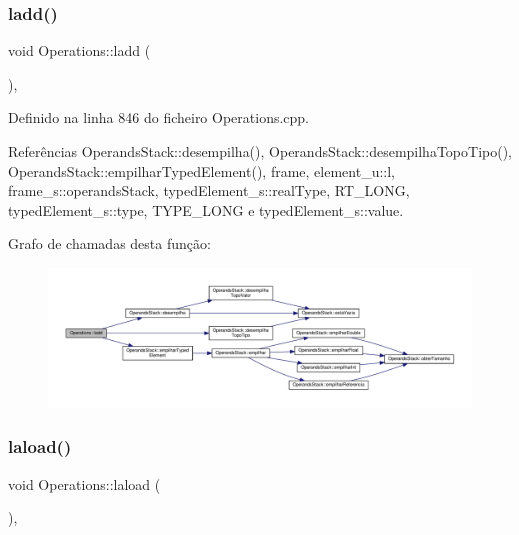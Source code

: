 \subsubsection{\texorpdfstring{ladd()}{ladd()}}
{\footnotesize\ttfamily void Operations\+::ladd (\begin{DoxyParamCaption}{ }\end{DoxyParamCaption})\hspace{0.3cm}{\ttfamily [static]}, {\ttfamily [private]}}



Definido na linha 846 do ficheiro Operations.\+cpp.



Referências Operands\+Stack\+::desempilha(), Operands\+Stack\+::desempilha\+Topo\+Tipo(), Operands\+Stack\+::empilhar\+Typed\+Element(), frame, element\+\_\+u\+::l, frame\+\_\+s\+::operands\+Stack, typed\+Element\+\_\+s\+::real\+Type, R\+T\+\_\+\+L\+O\+NG, typed\+Element\+\_\+s\+::type, T\+Y\+P\+E\+\_\+\+L\+O\+NG e typed\+Element\+\_\+s\+::value.

Grafo de chamadas desta função\+:\nopagebreak
\begin{figure}[H]
\begin{center}
\leavevmode
\includegraphics[width=350pt]{classOperations_ad4b153d687baa98c26fcfe7c24e12f45_cgraph}
\end{center}
\end{figure}
\mbox{\label{classOperations_a064f10825e8f0153ef19d466845d3734}} 
\subsubsection{\texorpdfstring{laload()}{laload()}}
{\footnotesize\ttfamily void Operations\+::laload (\begin{DoxyParamCaption}{ }\end{DoxyParamCaption})\hspace{0.3cm}{\ttfamily [static]}, {\ttfamily [private]}}



